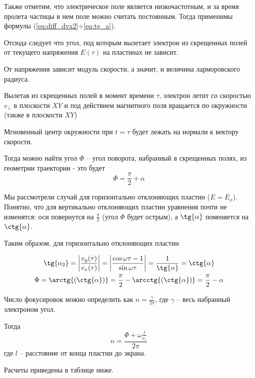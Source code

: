 Также отметим, что электрическое поле является низкочастотным, и за время пролета частицы в нем поле можно считать постоянным. Тогда применимы формулы (\ref{eq:diff_dvx2}$\div$\ref{eq:tg_a}).

Отсюда следует что угол, под которым вылетает электрон из скрещенных полей от текущего напряжения $E(\tau)$ на пластинах не зависит. 

От напряжения зависит модуль скорости, а значит, и величина ларморовского радиуса. 

Вылетая из скрещенных полей в момент времени $\tau$, электрон летит со скоростью $v_\perp$ в плоскости $XY$ и под действием магнитного поля вращается по окружности (также в плоскости $XY$)

Мгновенный центр окружности при $t=\tau$ будет лежать на нормали к вектору скорости.

Тогда можно найти угол $\Phi$ -- угол поворота, набранный в скрещенных полях, из геометрии траектории - это будет $$\Phi=\frac{\pi}{2}+\alpha$$

Мы рассмотрели случай для горизонтально отклоняющих пластин ($E=E_x$). Понятно, что для вертикально отклоняющих пластин уравнения почти не изменятся: оси повернутся на $\frac{\pi}{2}$ (угол $\Phi$ будет острым), а $\tg{\alpha}$ поменяется на $\ctg{\alpha}$.

Таким образом, для горизонтально отклоняющих пластин 

\begin{gather}
	\tg{\alpha_2}=\left|\frac{v_y(\tau)}{v_x(\tau)}\right|=\left|\frac{\cos\omega{\tau}-1}{\sin{\omega{\tau}}}\right|=\frac{1}{\tg{\alpha}}=\ctg{\alpha}\\
	\Phi=\arctg{(\ctg{\alpha})}=\frac{\pi}{2}-\arcctg{(\ctg{\alpha})}=\frac{\pi}{2}-\alpha
\end{gather}

Число фокусировок можно определить как $n=\frac{\gamma}{2\pi}$, где $\gamma$ -- весь набранный электроном угол.

Тогда
\begin{equation}
	n=\frac{\Phi+\omega\frac{l}{v_z}}{2\pi}
\end{equation}
где $l$ -- расстояние от конца пластин до экрана.

Расчеты приведены в таблице ниже.

